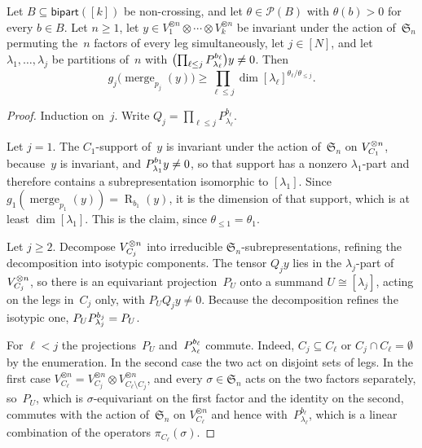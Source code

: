 \documentclass[11pt,letterpaper]{article}
\DeclareMathOperator{\tensorrank}{R}
\DeclareMathOperator{\merge}{merge}
\newcommand{\bipart}{\mathsf{bipart}}
\begin{document}
\begin{lemma}\label{lem:atleast}
Let $B \subseteq \bipart([k])$ be non-crossing, and let $\theta \in \mathcal{P}(B)$ with $\theta(b) > 0$ for every $b \in B$. Let $n \geq 1$, let $y \in V_1^{\otimes n} \otimes \cdots \otimes V_k^{\otimes n}$ be invariant under the action of~$\mathfrak{S}_n$ permuting the~$n$ factors of every leg simultaneously, let $j \in [N]$, and let $\lambda_1, \ldots, \lambda_j$ be partitions of~$n$ with $\bigl( \prod_{\ell \leq j} P^{\smash[t]{b_\ell}}_{\lambda_\ell} \bigr) y \neq 0$. Then
\[
g_j\bigl( \merge_{p_j}(y) \bigr) \geq \prod_{\ell \leq j} \dim[\lambda_\ell]^{\theta_\ell / \theta_{\leq j}}.
\]
\end{lemma}
\begin{proof}
Induction on~$j$. Write $Q_j = \prod_{\ell \leq j} P^{b_\ell}_{\lambda_\ell}$.

Let $j = 1$. The $C_1$-support of~$y$ is invariant under the action of~$\mathfrak{S}_n$ on $V_{C_1}^{\smash[t]{\otimes n}}$, because~$y$ is invariant, and $P^{\smash[t]{b_1}}_{\lambda_1} y \neq 0$, so that support has a nonzero $\lambda_1$-part and therefore contains a subrepresentation isomorphic to $[\lambda_1]$. Since $g_1(\merge_{p_1}(y)) = \tensorrank_{b_1}(y)$, it is the dimension of that support, which is at least $\dim[\lambda_1]$. This is the claim, since $\theta_{\leq 1} = \theta_1$.

Let $j \geq 2$. Decompose $V_{\smash[b]{C_j}}^{\otimes n}$ into irreducible $\mathfrak{S}_n$-subrepresentations, refining the decomposition into isotypic components. The tensor $Q_j y$ lies in the $\lambda_j$-part of $V_{\smash[b]{C_j}}^{\otimes n}$, so there is an equivariant projection~$P_U$ onto a summand $U \cong [\lambda_j]$, acting on the legs in~$C_j$ only, with $P_U Q_j y \neq 0$. Because the decomposition refines the isotypic one, $P_U P^{b_j}_{\smash{\lambda_j}} = P_U$.

For $\ell < j$ the projections~$P_U$ and~$P^{\smash[t]{b_\ell}}_{\lambda_\ell}$ commute. Indeed, $C_j \subseteq C_\ell$ or $C_j \cap C_\ell = \emptyset$ by the enumeration. In the second case the two act on disjoint sets of legs. In the first case $V_{C_\ell}^{\otimes n} = V_{C_j}^{\otimes n} \otimes V_{C_\ell \setminus C_j}^{\otimes n}$, and every $\sigma \in \mathfrak{S}_n$ acts on the two factors separately, so~$P_U$, which is $\sigma$-equivariant on the first factor and the identity on the second, commutes with the action of~$\mathfrak{S}_n$ on $V_{C_\ell}^{\otimes n}$ and hence with~$P^{b_\ell}_{\lambda_\ell}$, which is a linear combination of the operators $\pi_{C_\ell}(\sigma)$.


\end{proof}
\end{document}
